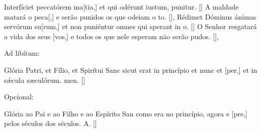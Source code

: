 {  %
  {Interfíciet peccatórem ma[tia,] et qui odérunt iustum, puni\-tur. [\LinkLA]}%
    {A maldade matará o peca[,] e serão punidos os que odeiam o to. [\LinkPT]},
  {Rédimet Dóminus ánimas servórum su[rum,] et non puniéntur omnes qui sperant in o. [\LinkLA]}%
    {O Senhor resgatará a vida dos seus [vos,] e todos os que nele esperam não serão pudos. [\LinkPT]},
  {\begin{rubrica}Ad libítum:\end{rubrica} Glória Patri, et Fílio, et Spirítui Sanc sicut erat in princípio et nunc et [per,] et in sǽcula sæculórum. men. [\LinkLA]}%
    {\begin{rubrica}Opcional:\end{rubrica} Glória ao Pai e ao Filho e ao Espírito San como era no princípio, agora e [pre,] pelos séculos dos séculos. A. [\LinkPT]}
}